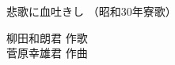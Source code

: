 \documentclass[10pt,b5j]{tarticle} %
\begin{document}
\begin{minipage}[c]{0.7\hsize} %
    \begin{center}
        {\LARGE
            悲歌に血吐きし %
        }
        {\small 
            （昭和30年寮歌） %
        }
    \end{center}
\end{minipage}
\begin{minipage}[c]{0.3\hsize} %
    \begin{flushright} %
        柳田和朗君 作歌\\菅原幸雄君 作曲 %
    \end{flushright}
\end{minipage}
\end{document}
